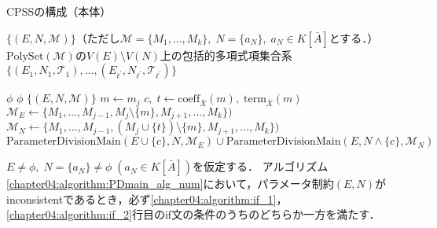 \begin{algorithm}[htbp]
	\caption{CPSSの構成（本体）}
	\label{chapter04:algorithm:PDmain_alg_num}
	\begin{algorithmic}[1]

		\Require $\{ (E, N, \mathcal{M}) \}$（ただし$\mathcal{M} = \{ M_1, \dots, M_k \}, \; N = \{ a_N \}, \; a_N \in K[\bar{A}]$とする．）
		\Ensure $\mathrm{PolySet}(\mathcal{M})$の$V(E) \setminus V(N)$上の包括的多項式項集合系$\{ (E_1, N_1, \mathscr{T}_1), \dots, (E_{\ell^\prime}, N_{\ell^\prime}, \mathscr{T}_{\ell^\prime})\}$

		 \label{chapter04:algorithm:if_1}
			\State \Return $\phi$
		\EndIf
		 \label{chapter04:algorithm:if_2}
			\State \Return $\phi$
		\EndIf
		 \label{chapter04:algorithm:if_3}
			\State \Return $\{ (E, N,\mathcal{M}) \}$
		\EndIf
		 \label{chapter04:algorithm:if_4}
			\State $m \gets m_j$
			\State $c, \; t \gets \mathrm{coeff}_{\bar{X}}(m), \; \mathrm{term}_{\bar{X}}(m)$
		\EndIf
		\State $\mathcal{M}_E \gets \{ M_1, \dots, M_{j-1}, M_j \setminus \{ m \}, M_{j+1}, \dots, M_k \})$ \label{chapter04:algorithm:TE}
		\State $\mathcal{M}_N \gets \{ M_1, \dots, M_{j-1}, (M_j \cup \{ t \}) \setminus \{ m \}, M_{j+1}, \dots, M_k \})$ \label{chapter04:algorithm:TN}
		\State \Return $\mathrm{ParameterDivisionMain}(E \cup \{ c \}, N, \mathcal{M}_E) \cup \mathrm{ParameterDivisionMain}(E, N \land \{ c \}, \mathcal{M}_N)$ \label{chapter04:algorithm:return}
		\EndFunction
	\end{algorithmic}
\end{algorithm}

\begin{lemma}
	\label{chapter04:lemma:for_alg_3}
	$E \ne \phi,\; N = \{a_N\} \ne \phi \;(a_N \in K[\bar{A}])$を仮定する．
	アルゴリズム \ref{chapter04:algorithm:PDmain_alg_num}において，パラメータ制約$(E, N)$がinconsistentであるとき，必ず\ref{chapter04:algorithm:if_1}，\ref{chapter04:algorithm:if_2}行目のif文の条件のうちのどちらか一方を満たす．
\end{lemma}

